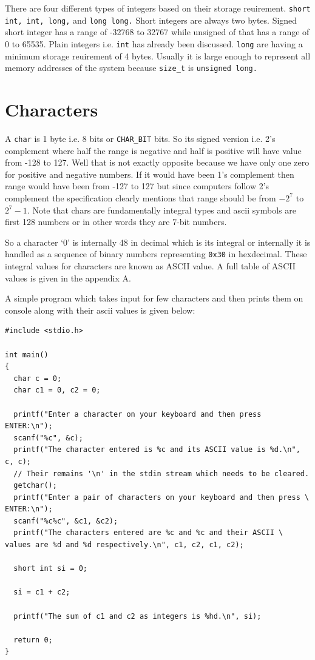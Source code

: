 There are four different types of integers based on their storage
reuirement. \texttt{short int, int, long,} and \texttt{long long.} Short
integers are always two bytes. Signed short integer has a range of -32768 to
32767 while unsigned of that has a range of 0 to 65535. Plain integers
i.e. \texttt{int} has already been discussed. \texttt{long} are having a
minimum storage reuirement of 4 bytes. Usually it is large enough to represent
all memory addresses of the system because \texttt{size\_t} is
\texttt{unsigned long.}

\section{Characters}
A \texttt{char} is 1 byte i.e. 8 bits or \texttt{CHAR\_BIT} bits. So its signed
version i.e. 2's 
complement where half the range is negative and half is positive will have
value from -128 to 127. Well that is not exactly opposite because we have only
one zero for positive and negative numbers. If it would have been 1's
complement then range would have been from -127 to 127 but since computers
follow 2's complement the specification clearly mentions that range should be
from $-2^7$ to $2^7 - 1.$ Note that chars are fundamentally integral types and
ascii symbols are first 128 numbers or in other words they are 7-bit numbers.

So a character `0' is internally 48 in decimal which is its integral or
internally it is handled as a sequence of binary numbers representing
\texttt{0x30} in hexdecimal. These integral values for characters are known as
ASCII value. A full table of ASCII values is given in the appendix A.

A simple program which takes input for few characters and then prints them on
console along with their ascii values is given below:

\begin{verbatim}
#include <stdio.h>

int main()
{
  char c = 0;
  char c1 = 0, c2 = 0;

  printf("Enter a character on your keyboard and then press ENTER:\n");
  scanf("%c", &c);
  printf("The character entered is %c and its ASCII value is %d.\n", c, c);
  // Their remains '\n' in the stdin stream which needs to be cleared.
  getchar();
  printf("Enter a pair of characters on your keyboard and then press \
ENTER:\n");
  scanf("%c%c", &c1, &c2);
  printf("The characters entered are %c and %c and their ASCII \
values are %d and %d respectively.\n", c1, c2, c1, c2);

  short int si = 0;

  si = c1 + c2;

  printf("The sum of c1 and c2 as integers is %hd.\n", si);

  return 0;
}
\end{verbatim}

